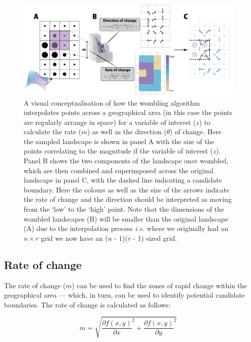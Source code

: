 \begin{figure}[h]
    \centering
    \includegraphics[width=\textwidth]{figures/fig_concept.png}
    \caption{A visual conceptualisation of how the wombling algorithm
interpolates points across a geographical area (in this case the points
are regularly arrange in space) for a variable of interest (\(z\)) to
calculate the rate ($m$) as well as the direction ($\theta$) of
change. Here the sampled landscape is shown in panel A with the size of
the points correlating to the magnitude if the variable of interest
($z$). Panel B shows the two components of the landscape once wombled,
which are then combined and superimposed across the original landscape
in panel C, with the dashed line indicating a candidate boundary. Here
the colours as well as the size of the arrows indicate the rate of
change and the direction should be interpreted as moving from the `low'
to the `high' point. Note that the dimensions of the wombled landscapes
(B) will be smaller than the original landscape (A) due to the
interpolation process \emph{i.e.} where we originally had an
\(n \times r\) grid we now have an (\(n\) - 1)(\(r\) - 1) sized
grid.}
    \label{fig:concept}
\end{figure}

\subsection{Rate of change}\label{rate-of-change}

The rate of change ($m$) can be used to find the zones of rapid change
within the geographical area --- which, in turn, can be used to identify
potential candidate boundaries. The rate of change is calculated as
follows:

\begin{equation} \label{eq:1}
m = \sqrt{\frac{\partial f(x,y)}{\partial x}^2 + \frac{\partial f(x,y)}{\partial y}^2}
\end{equation}

